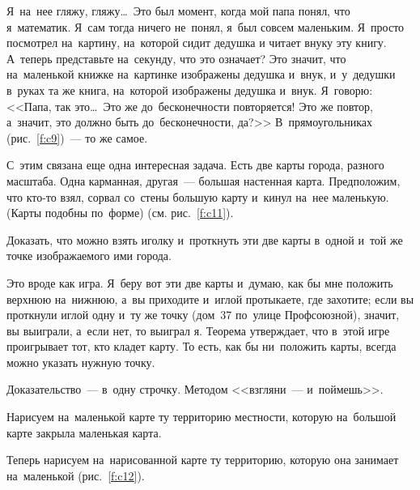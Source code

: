 
Я~на~нее гляжу, гляжу\ldots\ Это был момент, когда мой папа понял, что
я~математик.
Я~сам тогда ничего не~понял, я~был совсем маленьким. Я~просто посмотрел на~картину,
на~которой сидит дедушка и читает внуку эту книгу.
А~теперь
представьте на~секунду, что это означает? Это значит, что на~маленькой книжке на~картинке
изображены дедушка и~внук, и~у~дедушки в~руках та же книга, на~которой изображены дедушка и~внук.
Я~говорю: <<Папа, так это\ldots\ Это же до~бесконечности повторяется! Это же повтор, а~значит, это
должно быть до~бесконечности, да?>> В~прямоугольниках (рис.~\ref{f:c9})~--- то же самое.

С~этим связана еще одна интересная задача. Есть две карты города, разного масштаба. Одна карманная,
другая~--- большая настенная карта. Предположим, что кто-то взял, сорвал со~стены большую карту
и~кинул на~нее маленькую. (Карты подобны по~форме) (см. рис.~\ref{f:c11}).

Доказать, что можно взять иголку и~проткнуть эти две карты в~одной и~той же точке изображаемого ими города.

Это вроде как игра. Я~беру вот эти две карты и~думаю, как бы мне положить верхнюю на~нижнюю, а~вы
приходите и~иглой протыкаете, где захотите; если вы проткнули иглой одну и~ту же точку (дом~37
по~улице Профсоюзной), значит, вы выиграли, а~если нет, то выиграл я. Теорема утверждает, что
в~этой игре проигрывает тот, кто кладет карту. То есть, как бы ни~положить карты, всегда можно
указать нужную точку.

Доказательство~--- в~одну строчку. Методом <<взгляни~--- и~поймешь>>.

\pagebreak


Нарисуем на~маленькой карте ту территорию местности, которую на~большой карте закрыла маленькая карта.

Теперь нарисуем на~нарисованной карте ту территорию, которую она занимает на~маленькой (рис.~\ref{f:c12}).

